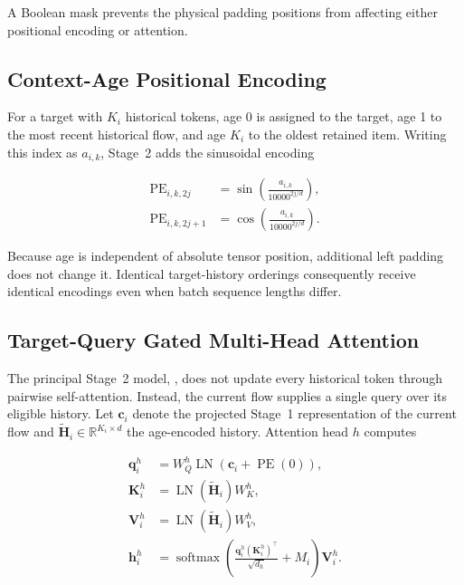 \documentclass[11pt,fleqn]{report}
\begin{document}
A Boolean mask prevents the physical padding positions from affecting either positional encoding or attention.

\subsection{Context-Age Positional Encoding}
\label{subsubsec:context_age_encoding}

For a target with $K_i$ historical tokens, age 0 is assigned to the target, age 1 to the most recent historical flow, and age $K_i$ to the oldest retained item. Writing this index as $a_{i,k}$, Stage~2 adds the sinusoidal encoding

\begin{align}
    \operatorname{PE}_{i,k,2j}
    &=\sin\left(
        \frac{a_{i,k}}{10000^{2j/d}}
      \right),\\
    \operatorname{PE}_{i,k,2j+1}
    &=\cos\left(
        \frac{a_{i,k}}{10000^{2j/d}}
      \right).
    \label{eq:stage2_age_encoding}
\end{align}

Because age is independent of absolute tensor position, additional left padding does not change it. Identical target-history orderings consequently receive identical encodings even when batch sequence lengths differ.

\subsection{Target-Query Gated Multi-Head Attention}
\label{subsubsec:target_query_attention}

The principal Stage~2 model, , does not update every historical token through pairwise self-attention. Instead, the current flow supplies a single query over its eligible history. Let $\mathbf{c}_i$ denote the projected Stage~1 representation of the current flow and $\widetilde{\mathbf{H}}_i\in\mathbb{R}^{K_i\times d}$ the age-encoded history. Attention head $h$ computes

\begin{align}
    \mathbf{q}^{h}_i
    &=W_Q^{h}\operatorname{LN}
      \left(\mathbf{c}_i+\operatorname{PE}(0)\right),\\
    \mathbf{K}^{h}_i
    &=\operatorname{LN}(\widetilde{\mathbf{H}}_i)W_K^{h},\\
    \mathbf{V}^{h}_i
    &=\operatorname{LN}(\widetilde{\mathbf{H}}_i)W_V^{h},\\
    \mathbf{h}^{h}_i
    &=\operatorname{softmax}
      \left(
        \frac{\mathbf{q}^{h}_i(\mathbf{K}^{h}_i)^{\top}}
             {\sqrt{d_h}}+M_i
      \right)
      \mathbf{V}^{h}_i.
    \label{eq:target_query_attention}
\end{align}
\end{document}
